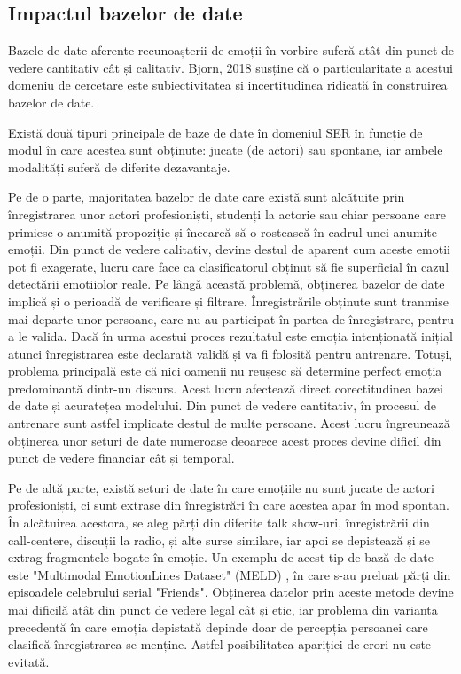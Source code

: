 \documentclass[a4paper,12pt]{book}
\begin{document}
				\subsection{Impactul bazelor de date}
					Bazele de date aferente recunoașterii de emoții în vorbire suferă atât din punct de vedere cantitativ cât și calitativ. Bjorn, 2018 \cite{bjorn1} susține că o particularitate a acestui domeniu de cercetare este subiectivitatea și incertitudinea ridicată în construirea bazelor de date. \par 
					Există două tipuri principale de baze de date în domeniul SER în funcție de modul în care acestea sunt obținute: jucate (de actori) sau spontane, iar ambele modalități suferă de diferite dezavantaje. \par
					Pe de o parte, majoritatea bazelor de date care există sunt alcătuite prin înregistrarea unor actori profesioniști, studenți la actorie sau chiar persoane care primiesc o anumită propoziție și încearcă să o rostească în cadrul unei anumite emoții. Din punct de vedere calitativ, devine destul de aparent cum aceste emoții pot fi exagerate, lucru care face ca clasificatorul obținut să fie superficial în cazul detectării emotiiolor reale. Pe lângă această problemă, obținerea bazelor de date implică și o perioadă de verificare și filtrare. Înregistrările obținute sunt tranmise mai departe unor persoane, care nu au participat în partea de înregistrare, pentru a le valida. Dacă în urma acestui proces rezultatul este emoția intenționată inițial atunci înregistrarea este declarată validă și va fi folosită pentru antrenare. Totuși, problema principală este că nici oamenii nu reușesc să determine perfect emoția predominantă dintr-un discurs. Acest lucru afectează direct corectitudinea bazei de date și acuratețea modelului. Din punct de vedere cantitativ, în procesul de antrenare sunt astfel implicate destul de multe persoane. Acest lucru îngreunează obținerea unor seturi de date numeroase deoarece acest proces devine dificil din punct de vedere financiar cât și temporal.\par
					Pe de altă parte, există seturi de date în care emoțiile nu sunt jucate de actori profesioniști, ci sunt extrase din înregistrări în care acestea apar în mod spontan. În alcătuirea acestora, se aleg părți din diferite talk show-uri, înregistrării din call-centere, discuții la radio, și alte surse similare, iar apoi se depistează și se extrag fragmentele bogate în emoție. Un exemplu de acest tip de bază de date este "Multimodal EmotionLines Dataset" (MELD) \cite{meld}, în care s-au preluat părți din episoadele celebrului serial "Friends". Obținerea datelor prin aceste metode devine mai dificilă atât din punct de vedere legal cât și etic, iar problema din varianta precedentă în care emoția depistată depinde doar de percepția persoanei care clasifică înregistrarea se menține. Astfel posibilitatea apariției de erori nu este evitată. \par
\end{document}
